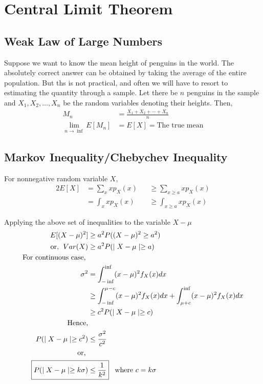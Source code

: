 \documentclass[../probability-notes.tex]{subfiles}
\begin{document}
    \chapter{Central Limit Theorem}
    \section{Weak Law of Large Numbers}
    Suppose we want to know the mean height of penguins in the world. The absolutely correct answer can be obtained by taking the average of the entire population. But ths is not practical, and often we will have to resort to estimating the quantity through a sample. Let there be $n$ penguins in the sample and $X_{1}, X_{2}, \ldots, X_{n}$ be the random variables denoting their heights. Then,
    \begin{align*}
        M_{n} &= \frac{X_{1} + X_{2} + \cdots + X_{n}}{n}\\
        \lim_{n \to \inf} E[M_{n}] &= E[X] = \text{The true mean}
    \end{align*}

    \section{Markov Inequality/Chebychev Inequality}
    For nonnegative random variable $X$,
    \begin{alignat*}{2}
        E[X] &= \sum_{x}xp_{X}(x) &&\geq \sum_{x \geq a}xp_{X}(x) \tag*{discrete case}\\
            &= \int_{x}xp_{X}(x) &&\geq \int_{x \geq a}xp_{X}(x) \tag*{continuous case}
    \end{alignat*}
    
    Applying the above set of inequalities to the variable $X - \mu$
    \begin{align*}
        E[(X - \mu)^{2}] &\geq a^{2} P((X - \mu)^{2} \geq a^{2}) \\
        \text{or, \;} Var(X) &\geq a^{2} P(\mid X - \mu \mid \geq a)\\
        \text{For continuous case, }\\
        \sigma^{2} &= \int_{-\inf}^{\inf} (x-\mu)^{2}f_{X}(x) dx\\
                  &\geq \int_{-\inf}^{\mu-c} (x-\mu)^{2}f_{X}(x)dx + \int_{\mu+c}^{\inf} (x-\mu)^{2}f_{X}(x)dx\\
                  &\geq c^{2} P(\mid X - \mu \mid \geq c)\\
        \text{Hence,}\\
        P(\mid X - \mu \mid \geq c^{2}) &\leq \frac{\sigma^{2}}{c^{2}}\\
        \text{or, } \\
        \Aboxed{P(\mid X - \mu \mid \geq k\sigma) &\leq \frac{1}{k^{2}}}\text{\;\;\;where $c = k\sigma$}
    \end{align*}
\end{document}
